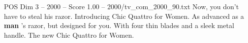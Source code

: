 \begin{textsample}{POS Dim 3 – 2000 – Score 1.00 – 2000/tv\_com\_2000\_90.txt}  \label{ex:f3_pos_090}
Now, you don't have to steal his razor.
Introducing Chic Quattro for Women.
As advanced as a \textbf{man} 's razor, but designed for you.
With four thin blades and a sleek metal handle.
The new Chic Quattro for Women.

\end{textsample}
